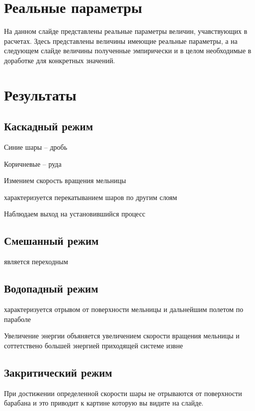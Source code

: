 \documentclass[a4paper]{article}
\begin{document}
\section{Реальные параметры}

На данном слайде представлены реальные параметры величин, учавствующих в расчетах.
Здесь представлены величины имеющие реальные параметры, а на следующем слайде величины полученные эмпирически и в целом необходимые в доработке для конкретных значений.
  


\section{Результаты}

\subsection{Каскадный режим}

Синие шары -- дробь

Коричневые -- руда 

Измением скорость вращения мельницы

характеризуется перекатыванием шаров по другим слоям

Наблюдаем выход на установившийся процесс

\subsection{Смешанный режим}

является переходным

\subsection{Водопадный режим}

характеризуется отрывом от поверхности мельницы и дальнейшим полетом по параболе

Увеличение энергии объяняется увеличением скорости вращения мельницы и соттетствено большей энергией приходящей системе извне

\subsection{Закритический режим}

При достижении определенной скорости шары не отрываются от поверхности барабана и это приводит к картине которую вы видите на слайде.
\end{document}
